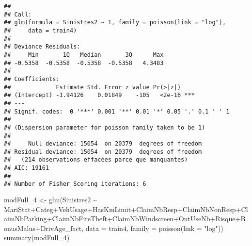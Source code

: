 \documentclass[
]{article}
\newenvironment{Shaded}{\begin{snugshade}}{\end{snugshade}}
\newcommand{\AttributeTok}[1]{\textcolor[rgb]{0.77,0.63,0.00}{#1}}
\newcommand{\FunctionTok}[1]{\textcolor[rgb]{0.00,0.00,0.00}{#1}}
\newcommand{\NormalTok}[1]{#1}
\newcommand{\OtherTok}[1]{\textcolor[rgb]{0.56,0.35,0.01}{#1}}
\newcommand{\SpecialCharTok}[1]{\textcolor[rgb]{0.00,0.00,0.00}{#1}}
\newcommand{\StringTok}[1]{\textcolor[rgb]{0.31,0.60,0.02}{#1}}
\begin{document}
\begin{verbatim}
## 
## Call:
## glm(formula = Sinistres2 ~ 1, family = poisson(link = "log"), 
##     data = train4)
## 
## Deviance Residuals: 
##     Min       1Q   Median       3Q      Max  
## -0.5358  -0.5358  -0.5358  -0.5358   4.3483  
## 
## Coefficients:
##             Estimate Std. Error z value Pr(>|z|)    
## (Intercept) -1.94126    0.01849    -105   <2e-16 ***
## ---
## Signif. codes:  0 '***' 0.001 '**' 0.01 '*' 0.05 '.' 0.1 ' ' 1
## 
## (Dispersion parameter for poisson family taken to be 1)
## 
##     Null deviance: 15054  on 20379  degrees of freedom
## Residual deviance: 15054  on 20379  degrees of freedom
##   (214 observations effacées parce que manquantes)
## AIC: 19161
## 
## Number of Fisher Scoring iterations: 6
\end{verbatim}

\begin{Shaded}
\begin{Highlighting}[]
\NormalTok{modFull\_4 }\OtherTok{\textless{}{-}} \FunctionTok{glm}\NormalTok{(Sinistres2 }\SpecialCharTok{\textasciitilde{}}\NormalTok{ MariStat}\SpecialCharTok{+}\NormalTok{Categ}\SpecialCharTok{+}\NormalTok{VehUsage}\SpecialCharTok{+}\NormalTok{HasKmLimit}\SpecialCharTok{+}\NormalTok{ClaimNbResp}\SpecialCharTok{+}\NormalTok{ClaimNbNonResp}\SpecialCharTok{+}\NormalTok{ClaimNbParking}\SpecialCharTok{+}\NormalTok{ClaimNbFireTheft}\SpecialCharTok{+}\NormalTok{ClaimNbWindscreen}\SpecialCharTok{+}\NormalTok{OutUseNb}\SpecialCharTok{+}\NormalTok{Risque}\SpecialCharTok{+}\NormalTok{BonusMalus}\SpecialCharTok{+}\NormalTok{DrivAge\_fact, }\AttributeTok{data =}\NormalTok{ train4, }\AttributeTok{family =} \FunctionTok{poisson}\NormalTok{(}\AttributeTok{link =} \StringTok{"log"}\NormalTok{))}
\FunctionTok{summary}\NormalTok{(modFull\_4)}
\end{Highlighting}
\end{Shaded}
\end{document}
